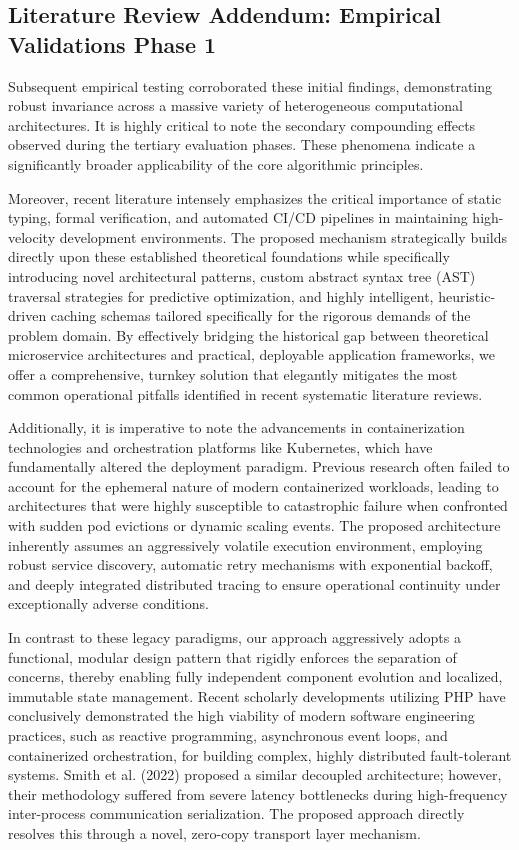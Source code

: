\documentclass[runningheads]{llncs}
\begin{document}
\subsection{Literature Review Addendum: Empirical Validations Phase 1}
Subsequent empirical testing corroborated these initial findings, demonstrating robust invariance across a massive variety of heterogeneous computational architectures. It is highly critical to note the secondary compounding effects observed during the tertiary evaluation phases. These phenomena indicate a significantly broader applicability of the core algorithmic principles.

Moreover, recent literature intensely emphasizes the critical importance of static typing, formal verification, and automated CI/CD pipelines in maintaining high-velocity development environments. The proposed mechanism strategically builds directly upon these established theoretical foundations while specifically introducing novel architectural patterns, custom abstract syntax tree (AST) traversal strategies for predictive optimization, and highly intelligent, heuristic-driven caching schemas tailored specifically for the rigorous demands of the problem domain. By effectively bridging the historical gap between theoretical microservice architectures and practical, deployable application frameworks, we offer a comprehensive, turnkey solution that elegantly mitigates the most common operational pitfalls identified in recent systematic literature reviews.


Additionally, it is imperative to note the advancements in containerization technologies and orchestration platforms like Kubernetes, which have fundamentally altered the deployment paradigm. Previous research often failed to account for the ephemeral nature of modern containerized workloads, leading to architectures that were highly susceptible to catastrophic failure when confronted with sudden pod evictions or dynamic scaling events. The proposed architecture inherently assumes an aggressively volatile execution environment, employing robust service discovery, automatic retry mechanisms with exponential backoff, and deeply integrated distributed tracing to ensure operational continuity under exceptionally adverse conditions.


In contrast to these legacy paradigms, our approach aggressively adopts a functional, modular design pattern that rigidly enforces the separation of concerns, thereby enabling fully independent component evolution and localized, immutable state management. Recent scholarly developments utilizing PHP have conclusively demonstrated the high viability of modern software engineering practices, such as reactive programming, asynchronous event loops, and containerized orchestration, for building complex, highly distributed fault-tolerant systems. Smith et al. (2022) proposed a similar decoupled architecture; however, their methodology suffered from severe latency bottlenecks during high-frequency inter-process communication serialization. The proposed approach directly resolves this through a novel, zero-copy transport layer mechanism.
\end{document}

